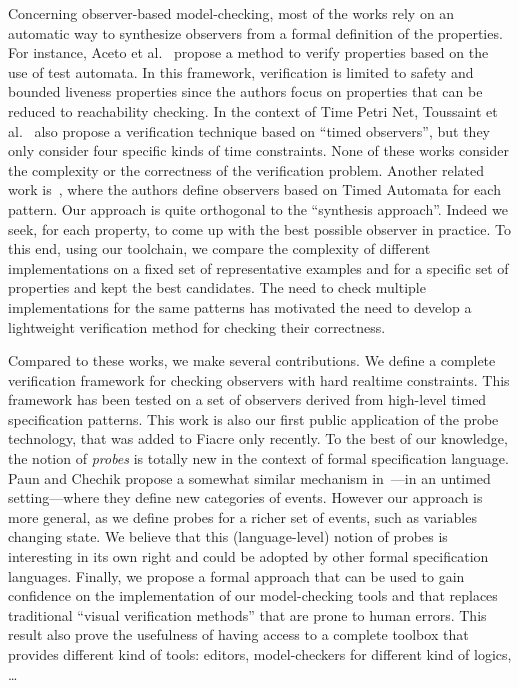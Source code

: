 \documentclass[a4paper]{scrartcl}
\begin{document}
Concerning observer-based model-checking, most of the works rely on an
automatic way to synthesize observers from a formal definition of the
properties. For instance, Aceto et al.~\cite{MCRTTA} propose a method
to verify properties based on the use of test automata. In this
framework, verification is limited to safety and bounded liveness
properties since the authors focus on properties that can be reduced
to reachability checking. In the context of Time Petri Net, Toussaint
et al.~\cite{TCVMBTPN} also propose a verification technique based on
``timed observers'', but they only consider four specific kinds of
time constraints. None of these works consider the complexity or the
correctness of the verification problem. Another related work
is~\cite{PTPS}, where the authors define observers based on Timed
Automata for each pattern.  Our approach is quite orthogonal to the
``synthesis approach''. Indeed we seek, for each property, to come up
with the best possible observer in practice. To this end, using our
toolchain, we compare the complexity of different implementations on a
fixed set of representative examples and for a specific set of
properties and kept the best candidates. The need to check multiple
implementations for the same patterns has motivated the need to
develop a lightweight verification method for checking their
correctness.  

Compared to these works, we make several contributions. We define a
complete verification framework for checking observers with hard
realtime constraints. This framework has been tested on a set of
observers derived from high-level timed specification patterns. This
work is also our first public application of the probe technology,
that was added to Fiacre only recently. To the best of our knowledge,
the notion of \emph{probes} is totally new in the context of formal
specification language. Paun and Chechik propose a somewhat similar
mechanism in~\cite{epp99,eeltp99}---in an untimed setting---where they
define new categories of events. However our approach is more general,
as we define probes for a richer set of events, such as variables
changing state. We believe that this (language-level) notion of probes
is interesting in its own right and could be adopted by other formal
specification languages. Finally, we propose a formal approach that
can be used to gain confidence on the implementation of our
model-checking tools and that replaces traditional ``visual
verification methods'' that are prone to human errors. This result
also prove the usefulness of having access to a complete toolbox that
provides different kind of tools: editors, model-checkers for
different kind of logics, \dots
\end{document}

